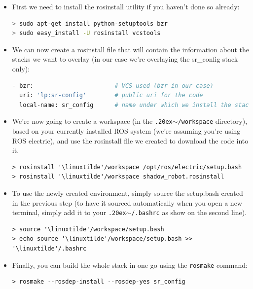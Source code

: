 \documentclass[12pt]{article}
\newcommand{\linuxtilde}{\raise.20ex\hbox{$\scriptstyle\mathtt{\sim}$}}
\begin{document}
\begin{itemize}
\item First we need to install the rosinstall utility if you haven't done so already:
  \begin{lstlisting}[language=Bash]
> sudo apt-get install python-setuptools bzr
> sudo easy_install -U rosinstall vcstools
  \end{lstlisting}

\item We can now create a rosinstall file that will contain the information about the stacks we want to overlay (in our case we're overlaying the sr\_config stack only):
  \begin{lstlisting}[title={\textbf{shadow\_robot.rosinstall}}, language=Python]
- bzr:                       # VCS used (bzr in our case)
  uri: 'lp:sr-config'        # public uri for the code
  local-name: sr_config      # name under which we install the stack
  \end{lstlisting}

\item We're now going to create a workspace (in the \texttt{\linuxtilde/workspace} directory), based on your currently installed ROS system (we're assuming you're using ROS electric), and use the rosinstall file we created to download the code into it.
  \begin{lstlisting}[escapeinside='']
> rosinstall '\linuxtilde'/workspace /opt/ros/electric/setup.bash
> rosinstall '\linuxtilde'/workspace shadow_robot.rosinstall
  \end{lstlisting}

\item To use the newly created environment, simply source the setup.bash created in the previous step (to have it sourced automatically when you open a new terminal, simply add it to your \texttt{\linuxtilde/.bashrc} as show on the second line).
  \begin{lstlisting}[escapeinside='']
> source '\linuxtilde'/workspace/setup.bash
> echo source '\linuxtilde'/workspace/setup.bash >> '\linuxtilde'/.bashrc
  \end{lstlisting}

\item Finally, you can build the whole stack in one go using the \texttt{rosmake} command:
  \begin{lstlisting}[escapeinside='']
> rosmake --rosdep-install --rosdep-yes sr_config
  \end{lstlisting}

\end{itemize}
\end{document}
